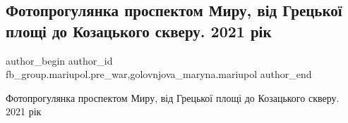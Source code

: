  
 
 
 
 

\subsection{Фотопрогулянка проспектом Миру, від Грецької площі до Козацького скверу.  2021 рік}
\label{sec:05_03_2023.fb.fb_group.mariupol.pre_war.1.fotoprogulyanka_pros}
 
\ifcmt
 author_begin
   author_id fb_group.mariupol.pre_war,golovnjova_maryna.mariupol
 author_end
\fi

Фотопрогулянка проспектом Миру, від Грецької площі до Козацького скверу. 
2021 рік

